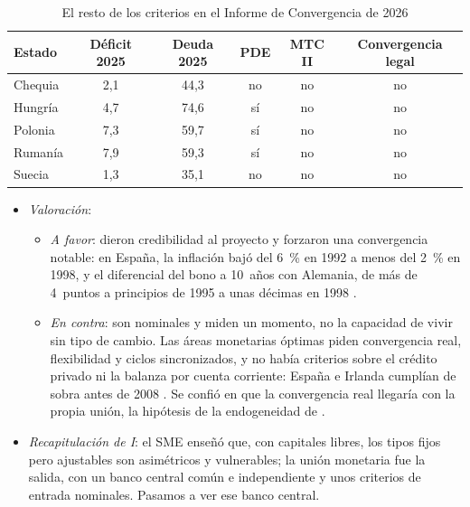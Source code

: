 \documentclass[11pt]{article}
\begin{document}
\begin{table}[H]
\centering
\caption{El resto de los criterios en el Informe de Convergencia de 2026}\label{tab:convergencia}
\small
\begin{tabular}{lccccc}
\hline
\rowcolor{tceeazulpalido}\textbf{Estado} & \textbf{Déficit 2025} & \textbf{Deuda 2025} & \textbf{PDE} & \textbf{MTC II} & \textbf{Convergencia legal}\\
\hline
Chequia & 2,1 & 44,3 & no & no & no\\
Hungría & 4,7 & 74,6 & \textcolor{tceerojo}{sí} & no & no\\
Polonia & 7,3 & 59,7 & \textcolor{tceerojo}{sí} & no & no\\
Rumanía & 7,9 & 59,3 & \textcolor{tceerojo}{sí} & no & no\\
Suecia & 1,3 & 35,1 & no & no & no\\
\hline
\end{tabular}
\end{table}

\begin{itemize}
\item \emph{Valoración}:
  \begin{itemize}
  \item \emph{A favor}: dieron credibilidad al proyecto y forzaron una convergencia notable: en España, la inflación bajó del 6~\% en 1992 a menos del 2~\% en 1998, y el diferencial del bono a 10~años con Alemania, de más de 4~puntos a principios de 1995 a unas décimas en 1998 .
  \item \emph{En contra}: son nominales y miden un momento, no la capacidad de vivir sin tipo de cambio. Las áreas monetarias óptimas piden convergencia real, flexibilidad y ciclos sincronizados, y no había criterios sobre el crédito privado ni la balanza por cuenta corriente: España e Irlanda cumplían de sobra antes de 2008 . Se confió en que la convergencia real llegaría con la propia unión, la hipótesis de la endogeneidad de \textcite{FrankelRose1998Endogeneity}.
  \end{itemize}
\item \emph{Recapitulación de I}: el SME enseñó que, con capitales libres, los tipos fijos pero ajustables son asimétricos y vulnerables; la unión monetaria fue la salida, con un banco central común e independiente y unos criterios de entrada nominales. Pasamos a ver ese banco central.
\end{itemize}
\end{document}
